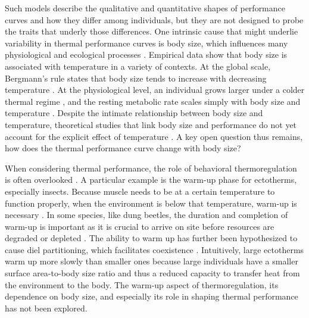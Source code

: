 Such models describe the qualitative and quantitative shapes of performance curves and how they differ among individuals, but they are not designed to probe the traits that underly those differences.  %
One intrinsic cause that might underlie variability in thermal performance curves is body size, which influences many physiological and ecological processes \citep{Peters1986}.
Empirical data show that body size is associated with temperature in a variety of contexts.
At the global scale, Bergmann's rule states that body size tends to increase with decreasing temperature \citep{Bergmann1847}.
At the physiological level, an individual grows larger under a colder thermal regime \citep{VanVoorhies1996}, and the resting metabolic rate scales simply with body size and temperature \citep{Kleiber1947, Peters1986, Gillooly2001, Brown2004}.
Despite the intimate relationship between body size and temperature, theoretical studies that link body size and performance do not yet account for the explicit effect of temperature \citep[e.g.,][]{Yodzis1992, Brown1993}.
A key open question thus remains, how does the thermal performance curve change with body size?

When considering thermal performance, the role of behavioral thermoregulation is often overlooked \citep{Kearney2009b}.
A particular example is the warm-up phase for ectotherms, especially insects.
Because muscle needs to be at a certain temperature to function properly, when the environment is below that temperature, warm-up is necessary \citep[e.g.,][]{Heinrich1975}.
In some species, like dung beetles, the duration and completion of warm-up is important as it is crucial to arrive on site before resources are degraded or depleted \citep{Hanski1991}. %
The ability to warm up has further been hypothesized to cause diel partitioning, which facilitates coexistence \citep{Viljanen2009}.
Intuitively, large ectotherms warm up more slowly than smaller ones because large individuals have a smaller surface area-to-body size ratio and thus a reduced capacity to transfer heat from the environment to the body.
The warm-up aspect of thermoregulation, its dependence on body size, and especially its role in shaping thermal performance has not been explored.

